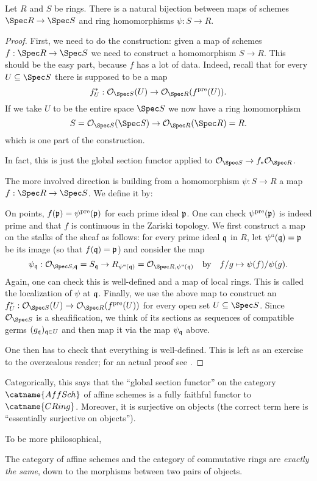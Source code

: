 \documentclass[11pt]{scrreprt}
\begin{document}
\begin{theorem}
	Let $R$ and $S$ be rings.
	There is a natural bijection between maps of schemes $\Spec R \to \Spec S$	
	and ring homomorphisms $\psi : S \to R$.
\end{theorem}
\begin{proof}
	First, we need to do the construction:
	given a map of schemes $f : \Spec R \to \Spec S$ 
	we need to construct a homomorphism $S \to R$.
	This should be the easy part, because $f$ has a lot of data.
	Indeed, recall that for every $U \subseteq \Spec S$
	there is supposed to be a map
	\[ f^\ast_U : \OO_{\Spec S} (U) \to \OO_{\Spec R}(f\pre(U)). \]
	If we take $U$ to be the entire space $\Spec S$ we now have a ring homomorphism
	\[ S = \OO_{\Spec S} (\Spec S) \to \OO_{\Spec R} (\Spec R) = R. \]
	which is one part of the construction.

	In fact, this is just the global section functor
	applied to $\OO_{\Spec S} \to f_\ast \OO_{\Spec R}$.

	The more involved direction is building from a homomorphism
	$\psi : S \to R$ a map $f : \Spec R \to \Spec S$.
	We define it by:
	\begin{itemize}
		\ii On points, $f(\mathfrak p) = \psi^{\text{pre}}(\mathfrak p)$ for each prime ideal $\mathfrak p$.
		One can check $\psi^{\text{pre}}(\mathfrak p)$ is indeed prime
		and that $f$ is continuous in the Zariski topology.
		\ii We first construct a map on the stalks of the sheaf as follows:
		for every prime ideal $\mathfrak q$ in $R$, let $\psi``(\mathfrak q) = \mathfrak p$ be its image
		(so that $f(\mathfrak q) = \mathfrak p$) and consider the map
		\[ \psi_\qq : \OO_{\Spec S, \qq} = S_{\qq}
			\to R_{\psi``(\qq)} = \OO_{\Spec R, \psi``(\qq)}
			\quad\text{by}\quad f/g \mapsto \psi(f)/\psi(g). \]
		Again, one can check this is well-defined and a map of local rings.
		This is called the localization of $\psi$ at $\mathfrak q$.
		\ii Finally, we use the above map to construct an
		$f^\ast_U : \OO_{\Spec S}(U) \to \OO_{\Spec R}(f\pre(U))$
		for every open set  $U \subseteq \Spec S$.
		Since $\OO_{\Spec S}$ is a sheafification, we think of its
		sections as sequences of compatible germs $(g_\mathfrak q)_{\mathfrak q \in U}$
		and then map it via the map $\psi_\mathfrak q$ above.
	\end{itemize}
	One then has to check that everything is well-defined.
	This is left as an exercise to the overzealous reader;
	for an actual proof see \cite[Proposition 6.3.2]{ref:vakil}.
\end{proof}
\begin{remark}
	Categorically, this says that the ``global section functor''
	on the category $\catname{AffSch}$ of affine schemes is a
	fully faithful functor to $\catname{CRing}$.
	Moreover, it is surjective on objects
	(the correct term here is ``essentially surjective on objects'').
\end{remark}
To be more philosophical,
\begin{moral}
	The category of affine schemes and the
	category of commutative rings are \emph{exactly the same},
	down to the morphisms between two pairs of objects.
\end{moral}
\end{document}
